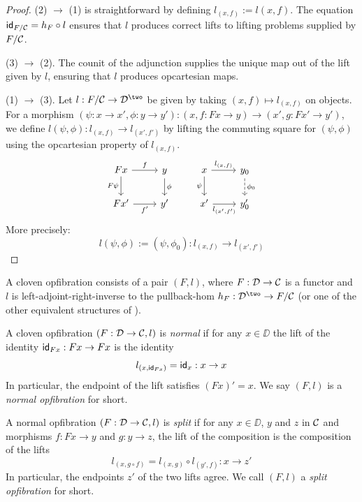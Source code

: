 \begin{proof}
  (2) $\to$ (1) is straightforward by
  defining $l_{(x,f)} := l (x,f)$.
  The equation $\mathsf{id}_{F / \mathcal{C}} = h_F \circ l$ ensures that
  $l$ produces correct lifts to lifting problems supplied by $F / \mathcal{C}$.

  (3) $\to$ (2).
  The counit of the adjunction supplies the unique map out of
  the lift given by $l$,
  ensuring that $l$ produces opcartesian maps.
  
  (1) $\to$ (3).
  Let $l : F / \CC \to \DD^\two$ be given by taking
  $(x, f) \mapsto l_{(x,f)}$ on objects.
  For a morphism $(\psi : x \to x', \phi : y \to y') : (x,f : F x \to y) \to (x',g : F x' \to y')$,
  we define $l (\psi,\phi) : l_{(x,f)} \to l_{(x',f')}$
  by lifting the commuting square for $(\psi,\phi)$
  using the opcartesian property of $l_{(x,f)}$.
  \[\begin{tikzcd}
    Fx & y & x & {y_0} \\
    {Fx'} & {y'} & {x'} & {y_0'}
    \arrow["f", from=1-1, to=1-2]
    \arrow["{F\psi}"', from=1-1, to=2-1]
    \arrow["\phi", from=1-2, to=2-2]
    \arrow["{l_{(x,f)}}", from=1-3, to=1-4]
    \arrow["\psi"', from=1-3, to=2-3]
    \arrow["{\phi_0}", dashed, from=1-4, to=2-4]
    \arrow["{f'}"', from=2-1, to=2-2]
    \arrow["{l_{(x',f')}}"', from=2-3, to=2-4]
  \end{tikzcd}\]
  More precisely:
  \[l (\psi,\phi) := (\psi,\phi_0) : l_{(x,f)} \to l_{(x',f')}\]
\end{proof}

\begin{definition}\label{def:split-opfibration}
  A cloven opfibration consists of a pair $(F,l)$,
  where $F : \mathcal{D} \to \mathcal{C}$ is a functor
  and $l$ is left-adjoint-right-inverse to
  the pullback-hom $h_F : \DD^\two \to F / \CC$
  (or one of the other equivalent structures of
  ).

  A cloven opfibration $(F : \mathcal{D} \to \mathcal{C},l)$
  is \emph{normal} if 
  for any $x \in \DD$ the lift of the identity
  $\mathsf{id}_{F x} : F x \to F x$ is the identity
  \[l_{(x,\mathsf{id}_{F x})} = \mathsf{id}_x : x \to x\]
  In particular, the endpoint of the lift satisfies $(F x)' = x$.
  We say $(F,l)$ is a \emph{normal opfibration} for short.

  A normal opfibration $(F : \mathcal{D} \to \mathcal{C}, l)$ is \emph{split} if
  for any $x \in \DD$, $y$ and $z$ in $\mathcal{C}$ and
  morphisms $f : F x \to y$ and $g : y \to z$,
  the lift of the composition is the composition of the lifts
  \[l_{(x,g \circ f)} = l_{(x,g)} \circ l_{(y',f)} : x \to z' \]
  In particular, the endpoints $z'$ of the two lifts agree.
  We call $(F,l)$ a \emph{split opfibration} for short.
\end{definition}

